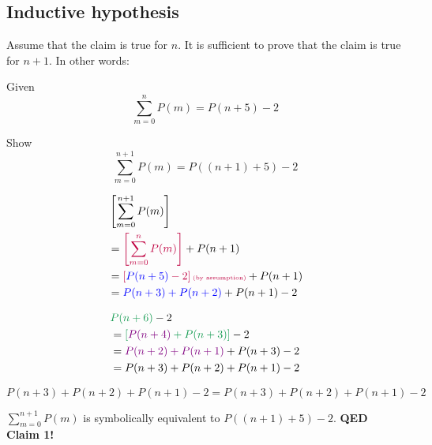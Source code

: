 \documentclass[11pt]{article}
\def \lf {\newline}
\begin{document}
\subsection*{Inductive hypothesis}

Assume that the claim is true for $n$. It is sufficient to prove that the claim is true for $n+1$. In other words:\lf

Given
\[
   \sum_{m=0}^{n} P(m) = P(n+5)-2
\]

Show
\[
   \sum_{m=0}^{n + 1} P(m) = P((n+1)+5)-2
\]

\begin{table}[h]
   \begin{subtable}[t]{0.45\textwidth}
      \begin{alignat*}{2}
         &\left[\sum_{m=0}^{n+1} P(m)\right] \\
         &=\textcolor{purple}{\left[\sum_{m=0}^{n} P(m)\right]}+P(n+1) \\
         &=\textcolor{purple}{\left[\textcolor{blue}{P(n+5)}-2\right]\text{\tiny(by assumption)}}+P(n+1) \\
         &=\textcolor{blue}{P(n+3)+P(n+2)}+P(n+1)-2
      \end{alignat*}
   \end{subtable}
   \vline
   \begin{subtable}[t]{0.45\textwidth}
      \begin{alignat*}{2}
         &\textcolor{ForestGreen}{P(n+6)}-2 \\
         &=\textcolor{ForestGreen}{\left[\textcolor{violet}{P(n+4)}+P(n+3)\right]}-2 \\
         &=\textcolor{violet}{P(n+2)+P(n+1)}+P(n+3)-2 \\
         &=P(n+3)+P(n+2)+P(n+1)-2
      \end{alignat*}
   \end{subtable}
\end{table}

\[
   P(n+3)+P(n+2)+P(n+1)-2 = P(n+3)+P(n+2)+P(n+1)-2
\]

$\displaystyle\sum_{m=0}^{n + 1} P(m)$ is symbolically equivalent to $P((n+1)+5)-2$. \textbf{QED Claim 1!}
\end{document}

